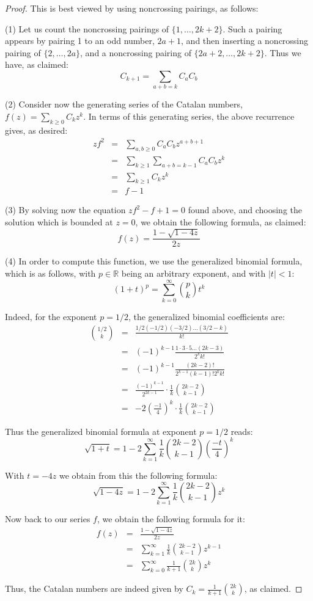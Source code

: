 \documentclass[12pt]{amsbook}
\begin{document}
\begin{proof}
This is best viewed by using noncrossing pairings, as follows: 

\medskip

(1) Let us count the noncrossing pairings of $\{1,\ldots,2k+2\}$. Such a pairing appears by pairing 1 to an odd number, $2a+1$, and then inserting a noncrossing pairing of $\{2,\ldots,2a\}$, and a noncrossing pairing of $\{2a+2,\ldots,2k+2\}$. Thus we have, as claimed:
$$C_{k+1}=\sum_{a+b=k}C_aC_b$$ 

(2) Consider now the generating series of the Catalan numbers, $f(z)=\sum_{k\geq0}C_kz^k$. In terms of this generating series, the above recurrence gives, as desired:
\begin{eqnarray*}
zf^2
&=&\sum_{a,b\geq0}C_aC_bz^{a+b+1}\\
&=&\sum_{k\geq1}\sum_{a+b=k-1}C_aC_bz^k\\
&=&\sum_{k\geq1}C_kz^k\\
&=&f-1
\end{eqnarray*}

(3) By solving now the equation $zf^2-f+1=0$ found above, and choosing the solution which is bounded at $z=0$, we obtain the following formula, as claimed:
$$f(z)=\frac{1-\sqrt{1-4z}}{2z}$$ 

(4) In order to compute this function, we use the generalized binomial formula, which is as follows, with $p\in\mathbb R$ being an arbitrary exponent, and with $|t|<1$:
$$(1+t)^p=\sum_{k=0}^\infty\binom{p}{k}t^k$$

Indeed, for the exponent $p=1/2$, the generalized binomial coefficients are:
\begin{eqnarray*}
\binom{1/2}{k}
&=&\frac{1/2(-1/2)(-3/2)\ldots(3/2-k)}{k!}\\
&=&(-1)^{k-1}\frac{1\cdot 3\cdot 5\ldots(2k-3)}{2^kk!}\\
&=&(-1)^{k-1}\frac{(2k-2)!}{2^{k-1}(k-1)!2^kk!}\\
&=&\frac{(-1)^{k-1}}{2^{2k-1}}\cdot\frac{1}{k}\binom{2k-2}{k-1}\\
&=&-2\left(\frac{-1}{4}\right)^k\cdot\frac{1}{k}\binom{2k-2}{k-1}
\end{eqnarray*}

Thus the generalized binomial formula at exponent $p=1/2$ reads:
$$\sqrt{1+t}=1-2\sum_{k=1}^\infty\frac{1}{k}\binom{2k-2}{k-1}\left(\frac{-t}{4}\right)^k$$

With $t=-4z$ we obtain from this the following formula:
$$\sqrt{1-4z}=1-2\sum_{k=1}^\infty\frac{1}{k}\binom{2k-2}{k-1}z^k$$

Now back to our series $f$, we obtain the following formula for it:
\begin{eqnarray*}
f(z)
&=&\frac{1-\sqrt{1-4z}}{2z}\\
&=&\sum_{k=1}^\infty\frac{1}{k}\binom{2k-2}{k-1}z^{k-1}\\
&=&\sum_{k=0}^\infty\frac{1}{k+1}\binom{2k}{k}z^k
\end{eqnarray*}

Thus, the Catalan numbers are indeed given by $C_k=\frac{1}{k+1}\binom{2k}{k}$, as claimed.
\end{proof}
\end{document}

